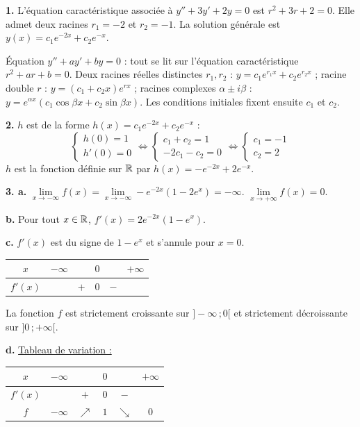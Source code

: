 \documentclass[11pt]{article}
\begin{document}

\textbf{1.} L'équation caractéristique associée à $y'' + 3y' + 2y = 0$ est $r^2 + 3r + 2 = 0$. Elle admet deux racines $r_1 = -2$ et $r_2 = -1$. La solution générale est $y(x) = c_1 e^{-2x} + c_2 e^{-x}$.

\begin{rappel}
Équation $y'' + ay' + by = 0$ : tout se lit sur l'équation
caractéristique $r^2 + ar + b = 0$. Deux racines réelles distinctes
$r_1, r_2$ : $y = c_1 e^{r_1 x} + c_2 e^{r_2 x}$ ; racine double $r$ :
$y = (c_1 + c_2 x)e^{rx}$ ; racines complexes $\alpha \pm i\beta$ :
$y = e^{\alpha x}(c_1\cos\beta x + c_2\sin\beta x)$. Les conditions
initiales fixent ensuite $c_1$ et $c_2$.
\end{rappel}

\textbf{2.} $h$ est de la forme $h(x) = c_1 e^{-2x} + c_2 e^{-x}$ :
\[ \begin{cases} h(0) = 1 \\ h'(0) = 0 \end{cases} \Longleftrightarrow \begin{cases} c_1 + c_2 = 1 \\ -2c_1 - c_2 = 0 \end{cases} \Longleftrightarrow \begin{cases} c_1 = -1 \\ c_2 = 2 \end{cases} \]
$h$ est la fonction définie sur $\mathbb{R}$ par $h(x) = -e^{-2x} + 2e^{-x}$.

\textbf{3. a.} $\lim\limits_{x\to-\infty} f(x) = \lim\limits_{x\to-\infty} -e^{-2x}(1 - 2e^x) = -\infty$. $\lim\limits_{x\to+\infty} f(x) = 0$.

\textbf{b.} Pour tout $x \in \mathbb{R}$, $f'(x) = 2e^{-2x}(1 - e^x)$.

\textbf{c.} $f'(x)$ est du signe de $1 - e^x$ et s'annule pour $x = 0$.
\begin{center}\renewcommand{\arraystretch}{1.4}
\begin{tabular}{|c|ccccc|}
\hline
$x$ & $-\infty$ & & $0$ & & $+\infty$ \\
\hline
$f'(x)$ & & $+$ & $0$ & $-$ & \\
\hline
\end{tabular}
\end{center}
La fonction $f$ est strictement croissante sur $]-\infty\,;0[$ et strictement décroissante sur $]0\,;+\infty[$.

\textbf{d.} \underline{Tableau de variation :}
\begin{center}\renewcommand{\arraystretch}{1.4}
\begin{tabular}{|c|ccccc|}
\hline
$x$ & $-\infty$ & & $0$ & & $+\infty$ \\
\hline
$f'(x)$ & & $+$ & $0$ & $-$ & \\
\hline
$f$ & $-\infty$ & $\nearrow$ & $1$ & $\searrow$ & $0$ \\
\hline
\end{tabular}
\end{center}
\end{document}
